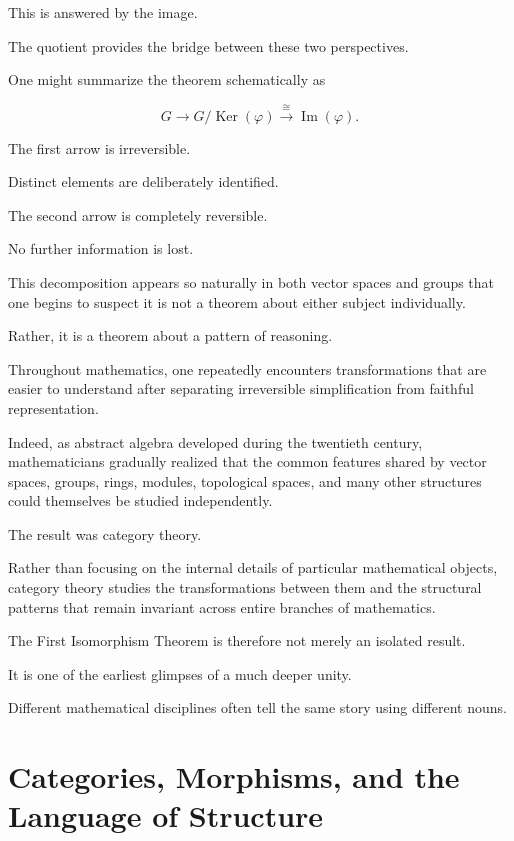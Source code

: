 \documentclass[11pt]{book}
\numberwithin{equation}{chapter}
\theoremstyle{definition}
\theoremstyle{plain}
\theoremstyle{remark}
\DeclareMathOperator{\Ker}{Ker}
\DeclareMathOperator{\Image}{Im}
\begin{document}
This is answered by the image.

The quotient provides the bridge between these two perspectives.

One might summarize the theorem schematically as

\[
G
\longrightarrow
G/\Ker(\varphi)
\overset{\cong}{\longrightarrow}
\Image(\varphi).
\]

The first arrow is irreversible.

Distinct elements are deliberately identified.

The second arrow is completely reversible.

No further information is lost.

This decomposition appears so naturally in both vector spaces and groups that one begins to suspect it is not a theorem about either subject individually.

Rather, it is a theorem about a pattern of reasoning.

Throughout mathematics, one repeatedly encounters transformations that are easier to understand after separating irreversible simplification from faithful representation.

Indeed, as abstract algebra developed during the twentieth century, mathematicians gradually realized that the common features shared by vector spaces, groups, rings, modules, topological spaces, and many other structures could themselves be studied independently.

The result was category theory.

Rather than focusing on the internal details of particular mathematical objects, category theory studies the transformations between them and the structural patterns that remain invariant across entire branches of mathematics.

The First Isomorphism Theorem is therefore not merely an isolated result.

It is one of the earliest glimpses of a much deeper unity.

Different mathematical disciplines often tell the same story using different nouns.


\chapter{Categories, Morphisms, and the Language of Structure}
\end{document}

